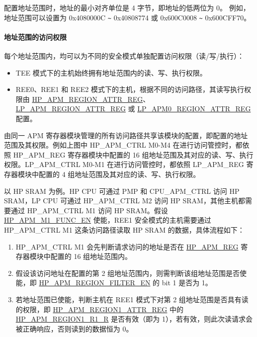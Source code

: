 \documentclass[main\_\_CN.tex]{subfiles}
\begin{document}
配置地址范围时，地址的最小对齐单位是 4 字节，即地址的低两位为 0。 例如，地址范围可以设置为 0x4080000C \verb+~+ 0x40808774 或 0x600C0008 \verb+~+ 0x600CFF70。

\paragraph{地址范围的访问权限}

每个地址范围内，均可以为不同的安全模式单独配置访问权限（读/写/执行）：

\begin{itemize}

    \item TEE 模式下的主机始终拥有地址范围内的读、写、执行权限。
    \item REE0、REE1 和 REE2 模式下的主机，根据不同的访问路径，其读写执行权限由 \hyperref[regdesc:HPAPMREGIONNATTRREG]{HP\_APM\_REGION\_ATTR\_REG}、 \hyperref[regdesc:LPAPMREGIONNATTRREG]{LP\_APM\_REGION\_ATTR\_REG} 或  \hyperref[regdesc:LPAPM0REGIONNATTRREG]{LP\_APM0\_REGION\_ATTR\_REG} 配置。

\end{itemize}

由同一 APM 寄存器模块管理的所有访问路径共享该模块的配置，即配置的地址范围及其权限。例如上图中 HP\_APM\_CTRL M0-M4 在进行访问管控时，都依照 HP\_APM\_REG 寄存器模块中配置的 16 组地址范围及其对应的读、写、执行权限。LP\_APM\_CTRL M0-M1 在进行访问管控时，都依照 LP\_APM\_REG 寄存器模块中配置的 4 组地址范围及其对应的读、写、执行权限。

以 HP SRAM 为例。HP CPU 可通过 PMP 和 CPU\_APM\_CTRL 访问 HP SRAM，LP CPU 可通过 HP\_APM\_CTRL M2 访问 HP SRAM，其他主机都需要通过 HP\_APM\_CTRL M1 访问 HP SRAM。假设 \hyperref[fielddesc:HPAPMM1FUNCEN]{HP\_APM\_M1\_FUNC\_EN} 使能，REE1 安全模式的主机需要通过 HP\_APM\_CTRL M1 这条访问路径读取 HP SRAM 的数据，具体流程如下：

\begin{enumerate}
    \item HP\_APM\_CTRL M1 会先判断请求访问的地址是否在 \hyperref[sec:permctrl-reg-hp]{HP\_APM\_REG} 寄存器模块中配置的 16 组地址范围内。
    \item 假设该访问地址在配置的第 2 组地址范围内，则需判断该组地址范围是否使能，即 \hyperref[fielddesc:HPAPMREGIONFILTEREN]{HP\_APM\_REGION\_FILTER\_EN} 的 bit 1 是否为 1。
    \item 若地址范围已使能，判断主机在 REE1 模式下对第 2 组地址范围是否具有读的权限，即  \hyperref[regdesc:HPAPMREGIONNATTRREG]{HP\_APM\_REGION1\_ATTR\_REG} 中的 \hyperref[fielddesc:HPAPMREGIONNR1R]{HP\_APM\_REGION1\_R1\_R} 是否有效（即为 1），若有效，则此次读请求会被正确响应，否则读到的数据恒为 0。
\end{enumerate}
\end{document}
